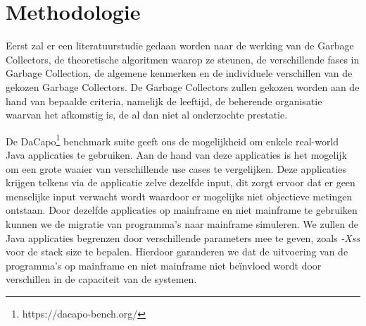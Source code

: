




\section{Methodologie}%
\label{sec:methodologie}


Eerst zal er een literatuurstudie gedaan worden naar de werking van de Garbage Collectors, de theoretische algoritmen waarop ze steunen, de verschillende fases in Garbage Collection, de algemene kenmerken en de individuele verschillen van de gekozen Garbage Collectors.
De Garbage Collectors zullen gekozen worden aan de hand van bepaalde criteria, namelijk de leeftijd, de beherende organisatie waarvan het afkomstig is, de al dan niet al onderzochte prestatie.

De DaCapo\footnote{https://dacapo-bench.org/} benchmark suite geeft ons de mogelijkheid om enkele real-world Java applicaties te gebruiken.
Aan de hand van deze applicaties is het mogelijk om een grote waaier van verschillende use cases te vergelijken.
Deze applicaties krijgen telkens via de applicatie zelve dezelfde input, dit zorgt ervoor dat er geen menselijke input verwacht wordt waardoor er mogelijks niet objectieve metingen ontstaan.
Door dezelfde applicaties op mainframe en niet mainframe te gebruiken kunnen we de migratie van programma's naar mainframe simuleren.
We zullen de Java applicaties begrenzen door verschillende parameters mee te geven, zoals \textit{-Xss} voor de stack size te bepalen.
Hierdoor garanderen we dat de uitvoering van de programma's op mainframe en niet mainframe niet beïnvloed wordt door verschillen in de capaciteit van de systemen.

